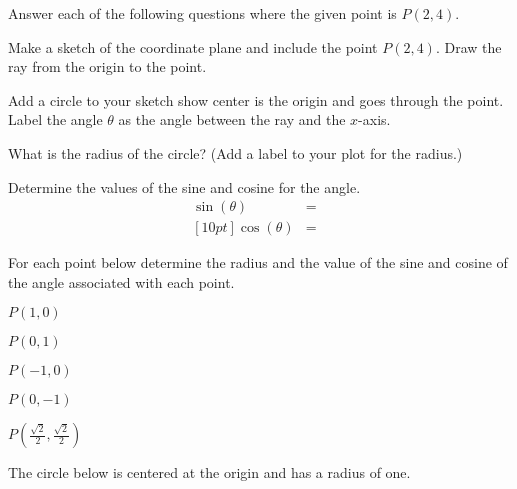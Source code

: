 \begin{problem}
\item Answer each of the following questions where the given point is $P(2,4)$.
  \begin{subproblem}
  \item Make a sketch of the coordinate plane and include the point
    $P(2,4)$. Draw the ray from the origin to the point.
    \vfill
  \item Add a circle to your sketch show center is the origin and goes
    through the point. Label the angle $\theta$ as the angle between
    the ray and the $x$-axis.
  \item What is the radius of the circle? (Add a label to your plot for the radius.)
    \vspace{2em}
  \item Determine the values of the sine and cosine for the angle.
    \begin{eqnarray*}
      \sin(\theta) & = & \\ [10pt]
      \cos(\theta) & = &
    \end{eqnarray*}
  \end{subproblem}

\clearpage

\item For each point below determine the radius and the value of the
  sine and cosine of the angle associated with each point.
  \begin{subproblem}
  \item $P(1,0)$
    \vfill
  \item $P(0,1)$
    \vfill
  \item $P(-1,0)$
    \vfill
  \item $P(0,-1)$
    \vfill
  \item $P\left(\frac{\sqrt{2}}{2},\frac{\sqrt{2}}{2}\right)$
    \vfill
  \end{subproblem}

\clearpage

\item The circle below is centered at the origin and has a radius of
  one.



\end{problem}
